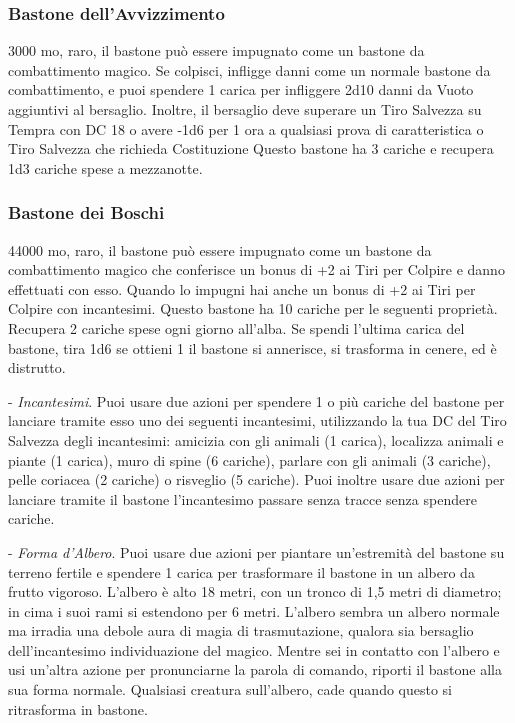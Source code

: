 \begin{multicols}{2}
	\subsubsection*{Bastone dell'Avvizzimento}
	3000 mo, raro, il bastone può essere impugnato come un bastone da combattimento magico. Se colpisci, infligge danni come un normale bastone da combattimento, e puoi spendere 1 carica per infliggere 2d10 danni da Vuoto aggiuntivi al bersaglio. Inoltre, il bersaglio deve superare un Tiro Salvezza su Tempra con DC 18 o avere -1d6 per 1 ora a qualsiasi prova di caratteristica o Tiro Salvezza che richieda Costituzione Questo bastone ha 3 cariche e recupera 1d3 cariche spese a mezzanotte.

	\subsubsection*{Bastone dei Boschi}
	44000 mo, raro, il bastone può essere impugnato come un bastone da combattimento magico che conferisce un bonus di +2 ai Tiri per Colpire e danno effettuati con esso. Quando lo impugni hai anche un bonus di +2 ai Tiri per Colpire con incantesimi.
	Questo bastone ha 10 cariche per le seguenti proprietà. Recupera 2 cariche spese ogni giorno all'alba. Se spendi l'ultima carica del bastone, tira 1d6 se ottieni 1 il bastone si annerisce, si trasforma in cenere, ed è distrutto.

	- \textit{Incantesimi}. Puoi usare due azioni per spendere 1 o più cariche del bastone per lanciare tramite esso uno dei seguenti incantesimi, utilizzando la tua DC del Tiro Salvezza degli incantesimi: amicizia con gli animali (1 carica), localizza animali e piante (1 carica), muro di spine (6 cariche), parlare con gli animali (3 cariche), pelle coriacea (2 cariche) o risveglio (5 cariche). Puoi inoltre usare due azioni per lanciare tramite il bastone l'incantesimo passare senza tracce senza
	spendere cariche.

	- \textit{Forma d'Albero}. Puoi usare due azioni per piantare un'estremità del bastone su terreno fertile e spendere 1 carica per trasformare il bastone in un albero da frutto vigoroso. L'albero è alto 18 metri, con un tronco di 1,5 metri di diametro; in cima i suoi rami si estendono per 6 metri. L'albero sembra un albero normale ma irradia una debole aura di magia di trasmutazione, qualora sia bersaglio dell'incantesimo individuazione del magico. Mentre sei in contatto con l'albero e usi un'altra azione per pronunciarne la parola di comando, riporti il bastone alla sua forma normale. Qualsiasi creatura sull'albero, cade quando questo si ritrasforma in bastone.


\end{multicols}
